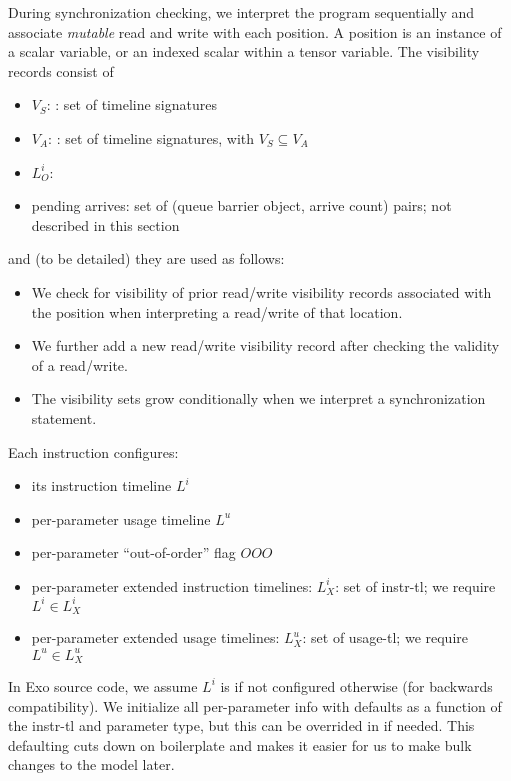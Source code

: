 During synchronization checking, we interpret the program sequentially and associate \textit{mutable} read and write  with each position.
A position is an instance of a scalar variable, or an indexed scalar within a tensor variable.
The visibility records consist of
\begin{itemize}
  \item $V_S$: : set of timeline signatures
  \filbreak
  \item $V_A$: : set of timeline signatures, with $V_S \subseteq V_A$
  \filbreak
  \item $L_O^i$: 
  \filbreak
  \item pending arrives: set of (queue barrier object, arrive count) pairs; not described in this section
\end{itemize}
\filbreak
and (to be detailed) they are used as follows:
\begin{itemize}
  \item We check for visibility of prior read/write visibility records associated with the position when interpreting a read/write of that location.
  \filbreak
  \item We further add a new read/write visibility record after checking the validity of a read/write.
  \filbreak
  \item The visibility sets grow conditionally when we interpret a synchronization statement.
\end{itemize}

\filbreak
{}

Each instruction configures:
\begin{itemize}
  \item its instruction timeline $L^i$
  \filbreak
  \item per-parameter usage timeline $L^u$
  \filbreak
  \item per-parameter ``out-of-order'' flag $OOO$
  \filbreak
  \item per-parameter extended instruction timelines: $L_X^i$: set of instr-tl; we require $L^i \in L_X^i$
  \filbreak
  \item per-parameter extended usage timelines: $L_X^u$: set of usage-tl; we require $L^u \in L_X^u$
\end{itemize}
In Exo source code, we assume $L^i$ is  if not configured otherwise (for backwards compatibility).
We initialize all per-parameter info with defaults as a function of the instr-tl and parameter  type, but this can be overrided in  if needed.
This defaulting cuts down on boilerplate and makes it easier for us to make bulk changes to the model later.

